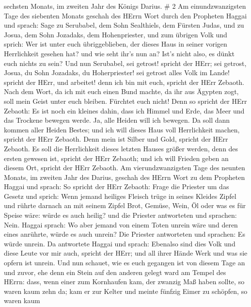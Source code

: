 sechsten Monats, im zweiten Jahr des Königs Darius. \# 2  Am
einundzwanzigsten Tage des siebenten Monats geschah des HErrn Wort durch
den Propheten Haggai und sprach:  Sage zu Serubabel, dem
Sohn Sealthiels, dem Fürsten Judas, und zu Josua, dem Sohn Jozadaks, dem
Hohenpriester, und zum übrigen Volk und sprich:  Wer ist
unter euch übriggeblieben, der dieses Haus in seiner vorigen
Herrlichkeit gesehen hat? und wie seht ihr's nun an? Ist's nicht also,
es dünkt euch nichts zu sein?  Und nun Serubabel, sei
getrost! spricht der HErr; sei getrost, Josua, du Sohn Jozadaks, du
Hoherpriester! sei getrost alles Volk im Lande! spricht der HErr, und
arbeitet! denn ich bin mit euch, spricht der HErr Zebaoth. 
Nach dem Wort, da ich mit euch einen Bund machte, da ihr aus Ägypten
zogt, soll mein Geist unter euch bleiben. Fürchtet euch nicht!
 Denn so spricht der HErr Zebaoth: Es ist noch ein kleines
dahin, dass ich Himmel und Erde, das Meer und das Trockene bewegen
werde.  Ja, alle Heiden will ich bewegen. Da soll dann
kommen aller Heiden Bestes; und ich will dieses Haus voll Herrlichkeit
machen, spricht der HErr Zebaoth.  Denn mein ist Silber und
Gold, spricht der HErr Zebaoth.  Es soll die Herrlichkeit
dieses letzten Hauses größer werden, denn des ersten gewesen ist,
spricht der HErr Zebaoth; und ich will Frieden geben an diesem Ort,
spricht der HErr Zebaoth.  Am vierundzwanzigsten Tage des
neunten Monats, im zweiten Jahr des Darius, geschah des HErrn Wort zu
dem Propheten Haggai und sprach:  So spricht der HErr
Zebaoth: Frage die Priester um das Gesetz und sprich:  Wenn
jemand heiliges Fleisch trüge in seines Kleides Zipfel und rührte
darnach an mit seinem Zipfel Brot, Gemüse, Wein, Öl oder was es für
Speise wäre: würde es auch heilig? und die Priester antworteten und
sprachen: Nein.  Haggai sprach: Wo aber jemand von einem
Toten unrein wäre und deren eines anrührte, würde es auch unrein? Die
Priester antworteten und sprachen: Es würde unrein.  Da
antwortete Haggai und sprach: Ebenalso sind dies Volk und diese Leute
vor mir auch, spricht der HErr; und all ihrer Hände Werk und was sie
opfern ist unrein.  Und nun schauet, wie es euch gegangen
ist von diesem Tage an und zuvor, ehe denn ein Stein auf den anderen
gelegt ward am Tempel des HErrn:  dass, wenn einer zum
Kornhaufen kam, der zwanzig Maß haben sollte, so waren kaum zehn da; kam
er zur Kelter und meinte fünfzig Eimer zu schöpfen, so waren kaum
